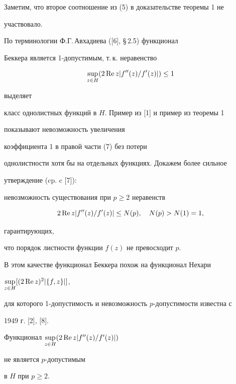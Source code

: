  


Заметим, что второе соотношение из (5) в доказательстве теоремы 1 не 


участвовало. 


 


По терминологии Ф.Г.\,Авхадиева ([6], \S\,2.5) функционал 


Беккера является 1-допустимым, т.\,к. неравенство 


\begin{equation} 


\sup_{z\in H}(2\re z|f''(z)/f'(z)|)\le 1 


\end{equation} 


выделяет 


класс однолистных функций в $H$. Пример из [1] и пример из теоремы 1 


показывают невозможность увеличения 


коэффициента 1 в правой части (7) без потери 


однолистности хотя бы на отдельных функциях. Докажем более сильное 


утверждение (cp. c [7]): 


невозможность существования при $p \ge 2$ неравенств 


$$ 


2\re z|f''(z)/f'(z)|\le N(p),\quad N(p)>N(1)=1, 


$$ 


гарантирующих, 


что порядок листности функции $f(z)$ не превосходит $p$. 


 


В этом качестве функционал Беккера похож на функционал Нехари 


$\sup\limits_{z\in H}[(2\operatorname{Re} z)^{2}|\{f,z\}|]$, 


для которого 1-допустимость и невозможность $p$-допустимости известна с 


1949 г. [2], [8]. 


 


 


\begin{thm} Функционал $\sup\limits_{z\in H}(2\operatorname{Re} z|f''(z)/f'(z)|)$ 


не является $p$-допустимым 


в $H$ при $p\ge 2$. 


\end{thm} 


